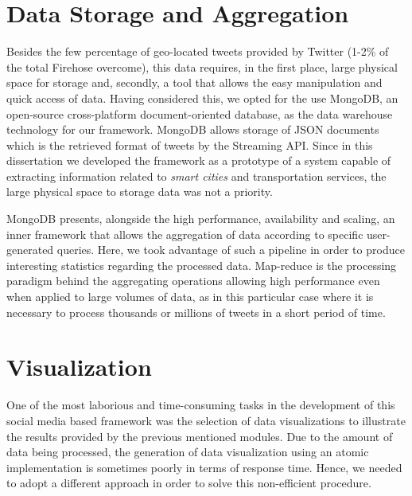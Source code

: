 \section{Data Storage and Aggregation}\label{sec:storage_aggregations}

Besides the few percentage of geo-located tweets provided by Twitter (1-2\% of the total Firehose overcome), this data requires, in the first place, large physical space for storage and, secondly, a tool that allows the easy manipulation and quick access of data. Having considered this, we opted for the use MongoDB, an open-source cross-platform document-oriented database, as the data warehouse technology for our framework. MongoDB allows storage of \gls{JSON} documents which is the retrieved format of tweets by the Streaming \gls{API}. Since in this dissertation we developed the framework as a prototype of a system capable of extracting information related to \textit{smart cities} and transportation services, the large physical space to storage data was not a priority.

MongoDB presents, alongside the high performance, availability and scaling, an inner framework that allows the aggregation of data according to specific user-generated queries. Here, we took advantage of such a pipeline in order to produce interesting statistics regarding the processed data. Map-reduce is the processing paradigm behind the aggregating operations allowing high performance even when applied to large volumes of data, as in this particular case where it is necessary to process thousands or millions of tweets in a short period of time.

\section{Visualization}\label{sec:visualization}

One of the most laborious and time-consuming tasks in the development of this social media based framework was the selection of data visualizations to illustrate the results provided by the previous mentioned modules. Due to the amount of data being processed, the generation of data visualization using an atomic implementation is sometimes poorly in terms of response time. Hence, we needed to adopt a different approach in order to solve this non-efficient procedure.

